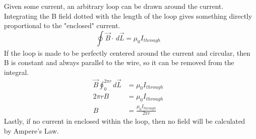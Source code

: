 \documentclass[12pt]{article}
\begin{document}
Given some current, an arbitrary loop can be drawn around the current. Integrating the 
B field dotted with the length of the loop gives something directly proportional to the
"enclosed" current.
\begin{equation*}
  \oint_{}^{} \overrightarrow{B} \cdot \, d \overrightarrow{L} = \mu_0 I_{through}
\end{equation*}
If the loop is made to be perfectly centered around the current and circular, then B
is constant and always parallel to the wire, so it can be removed from the integral.
\begin{align*}
  \overrightarrow{B}\oint_{0}^{2 \pi r} d \overrightarrow{L} &= \mu_0 I_{through} \\
  2 \pi rB &= \mu_0 I_{through} \\
  B &= \frac{\mu_0 I_{through}}{2 \pi r}
\end{align*}
Lastly, if no current in enclosed within the loop, then no field will be calculated by 
Ampere's Law.
\end{document}
